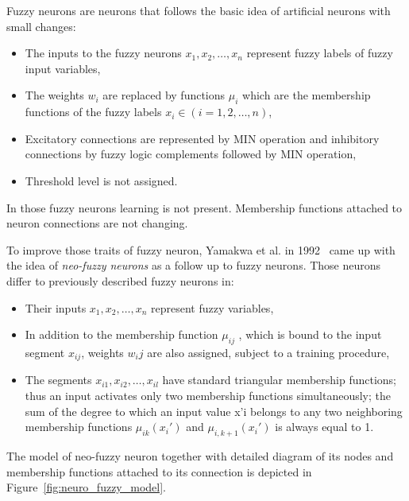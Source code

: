 Fuzzy neurons are neurons that follows the basic idea of artificial neurons with small changes:

\begin{itemize}
\item The inputs to the fuzzy neurons $x_1, x_2, \dots, x_n$ represent fuzzy labels of fuzzy input variables,
\item The weights $w_i$ are replaced by functions $\mu_i$ which are the membership functions of the fuzzy labels $x_i \in (i = 1, 2, \dots, n)$,
\item Excitatory connections are represented by MIN operation and inhibitory connections by fuzzy logic complements followed by MIN operation,
\item Threshold level is not assigned.
\end{itemize}

In those fuzzy neurons learning is not present.
Membership functions attached to neuron connections are not changing.

\clearpage
To improve those traits of fuzzy neuron, Yamakwa et al. in 1992~\cite{yamakawa} came up with the idea of \emph{neo-fuzzy neurons} as a follow up to fuzzy neurons.
Those neurons differ to previously described fuzzy neurons in:

\begin{itemize}
\item Their inputs $x_1, x_2, \dots, x_n$ represent fuzzy variables,
\item In addition to the membership function $\mu_{ij}$ , which is bound to the input segment $x_{ij}$, weights $w_ij$ are also assigned, subject to a training procedure,
\item The segments $x_{i1}, x_{i2}, \dots, x_{il}$ have standard triangular membership functions; thus an input activates only two membership functions simultaneously; the sum of the degree to which an input value x'i belongs to any two neighboring membership functions $\mu_{ik}(x_i')$ and $\mu_{i,k+1}(x_i')$ is always equal to 1.
\end{itemize}

The model of neo-fuzzy neuron together with detailed diagram of its nodes and membership functions attached to its connection is depicted in Figure~\ref{fig:neuro_fuzzy_model}.

